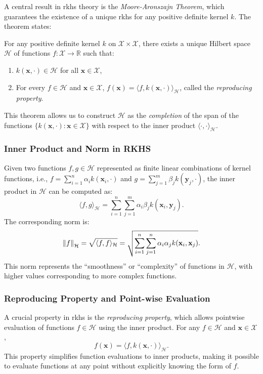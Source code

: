 A central result in \ac{rkhs} theory is the \textit{Moore-Aronszajn Theorem}, which guarantees the existence of a unique \ac{rkhs} for any positive definite kernel $k$. The theorem states:

\begin{theorem}
For any positive definite kernel $k$ on $\mathcal{X} \times \mathcal{X}$, there exists a unique Hilbert space $\mathcal{H}$ of functions $f: \mathcal{X} \to \mathbb{R}$ such that:
\begin{enumerate}
    \item $k(\mathbf{x}, \cdot) \in \mathcal{H}$ for all $\mathbf{x} \in \mathcal{X}$,
    \item For every $f \in \mathcal{H}$ and $\mathbf{x} \in \mathcal{X}$, $f(\mathbf{x}) = \langle f, k(\mathbf{x}, \cdot) \rangle_{\mathcal{H}}$, called the \textit{reproducing property}.
\end{enumerate}
\end{theorem}
This theorem allows us to construct $\mathcal{H}$ as the \textit{completion} of the span of the functions $\{k(\mathbf{x}, \cdot) : \mathbf{x} \in \mathcal{X}\}$ with respect to the inner product $\langle \cdot, \cdot \rangle_{\mathcal{H}}$.

\subsubsection{Inner Product and Norm in RKHS}

Given two functions $f, g \in \mathcal{H}$ represented as finite linear combinations of kernel functions, i.e., $f = \sum_{i=1}^n \alpha_i k(\mathbf{x}_i, \cdot)$ and $g = \sum_{j=1}^m \beta_j k(\mathbf{y}_j, \cdot)$, the inner product in $\mathcal{H}$ can be computed as:
\[
\langle f, g \rangle_{\mathcal{H}} = \sum_{i=1}^n \sum_{j=1}^m \alpha_i \beta_j k(\mathbf{x}_i, \mathbf{y}_j).
\]
The corresponding norm is:
\[
\norm{f}_{\mathcal{H}} = \sqrt{\langle f, f \rangle_{\mathcal{H}}} = \sqrt{\sum_{i=1}^n \sum_{j=1}^n \alpha_i \alpha_j k(\mathbf{x}_i, \mathbf{x}_j)}.
\]
This norm represents the ``smoothness'' or ``complexity'' of functions in $\mathcal{H}$, with higher values corresponding to more complex functions.

\subsubsection{Reproducing Property and Point-wise Evaluation}

A crucial property in \ac{rkhs} is the \textit{reproducing property}, which allows pointwise evaluation of functions $f \in \mathcal{H}$ using the inner product. For any $f \in \mathcal{H}$ and $\mathbf{x} \in \mathcal{X}$,
\[
f(\mathbf{x}) = \langle f, k(\mathbf{x}, \cdot) \rangle_{\mathcal{H}}.
\]
This property simplifies function evaluations to inner products, making it possible to evaluate functions at any point without explicitly knowing the form of $f$.


